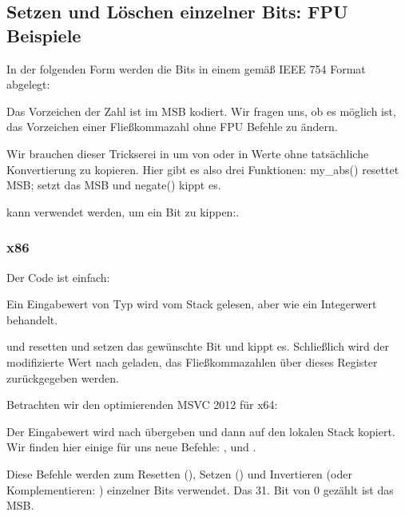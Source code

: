 \subsection{Setzen und Löschen einzelner Bits: \ac{FPU} Beispiele}

In der folgenden Form werden die Bits in einem \Tfloat gemäß IEEE 754 Format
abgelegt:


Das Vorzeichen der Zahl ist im \ac{MSB} kodiert.
Wir fragen uns, ob es möglich ist, das Vorzeichen einer Fließkommazahl ohne FPU
Befehle zu ändern.


Wir brauchen dieser Trickserei in \CCpp um von oder in \Tfloat Werte ohne
tatsächliche Konvertierung zu kopieren.
Hier gibt es also drei Funktionen: my\_abs() resettet \ac{MSB}; 
setzt das \ac{MSB} und negate() kippt es.

\XOR kann verwendet werden, um ein Bit zu kippen:.

\subsubsection{x86}

Der Code ist einfach:


Ein Eingabewert von Typ \Tfloat wird vom Stack gelesen, aber wie ein Integerwert
behandelt.

\AND und \OR resetten und setzen das gewünschte Bit und \XOR kippt es.
Schließlich wird der modifizierte Wert nach  geladen, das
Fließkommazahlen über dieses Register zurückgegeben werden.

Betrachten wir den optimierenden MSVC 2012 für x64:



Der Eingabewert wird nach  übergeben und dann auf den lokalen Stack
kopiert. Wir finden hier einige für uns neue Befehle: \BTR, \BTS und \BTC.

Diese Befehle werden zum Resetten (\BTR), Setzen (\BTS) und Invertieren (oder
Komplementieren: \BTC) einzelner Bits verwendet.
Das 31. Bit von 0 gezählt ist das \ac{MSB}.

